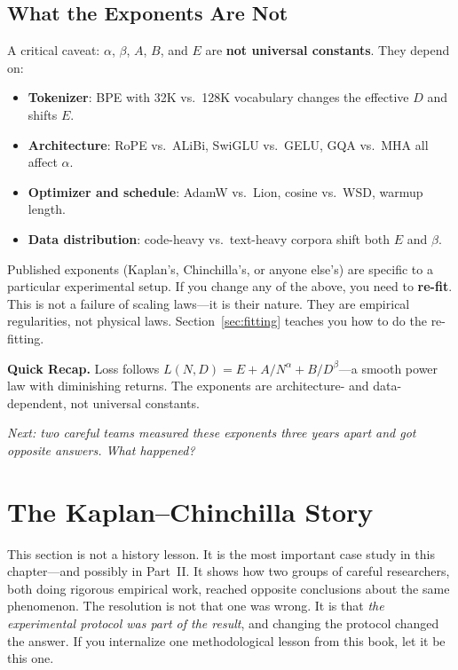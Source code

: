 \subsection{What the Exponents Are Not}
\label{sec:exponents-caveat}

A critical caveat: $\alpha$, $\beta$, $A$, $B$, and $E$ are \textbf{not universal constants}. They depend on:

\begin{itemize}[nosep]
  \item \textbf{Tokenizer}: BPE with 32K vs.\ 128K vocabulary changes the effective $D$ and shifts $E$.
  \item \textbf{Architecture}: RoPE vs.\ ALiBi, SwiGLU vs.\ GELU, GQA vs.\ MHA all affect $\alpha$.
  \item \textbf{Optimizer and schedule}: AdamW vs.\ Lion, cosine vs.\ WSD, warmup length.
  \item \textbf{Data distribution}: code-heavy vs.\ text-heavy corpora shift both $E$ and $\beta$.
\end{itemize}

Published exponents (Kaplan's, Chinchilla's, or anyone else's) are specific to a particular experimental setup. If you change any of the above, you need to \textbf{re-fit}. This is not a failure of scaling laws---it is their nature. They are empirical regularities, not physical laws. Section~\ref{sec:fitting} teaches you how to do the re-fitting.


\begin{quickrecap}
\textbf{Quick Recap.} Loss follows $L(N,D) = E + A/N^\alpha + B/D^\beta$---a smooth power law with diminishing returns. The exponents are architecture- and data-dependent, not universal constants.

\textit{Next: two careful teams measured these exponents three years apart and got opposite answers. What happened?}
\end{quickrecap}



\section{The Kaplan--Chinchilla Story}
\label{sec:kaplan-chinchilla}

This section is not a history lesson. It is the most important case study in this chapter---and possibly in Part~II. It shows how two groups of careful researchers, both doing rigorous empirical work, reached opposite conclusions about the same phenomenon. The resolution is not that one was wrong. It is that \emph{the experimental protocol was part of the result}, and changing the protocol changed the answer. If you internalize one methodological lesson from this book, let it be this one.

